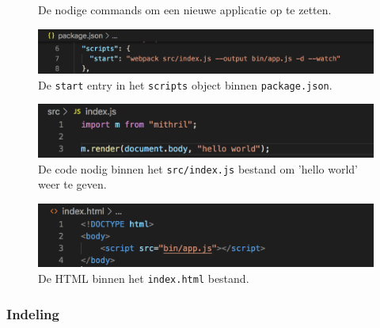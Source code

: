 \begin{figure}[!ht]
    \hfill
    \hfill
    \caption{De nodige commands om een nieuwe applicatie op te zetten.}
    \label{fig:setups}
\end{figure}

\begin{figure}
    \includegraphics[width=\textwidth]{./img/Mithril-package-json.png}
    \caption{De \texttt{start} entry in het \texttt{scripts} object binnen \texttt{package.json}.}
    \label{fig:mithril-package-json}
\end{figure}

\begin{figure}
    \includegraphics[width=\textwidth]{./img/Mithril-index-js.png}
    \caption{De code nodig binnen het \texttt{src/index.js} bestand om 'hello world' weer te geven.}
    \label{fig:mithril-index-js}
\end{figure}

\begin{figure}
    \includegraphics[width=\textwidth]{./img/Mithril-index-html.png}
    \caption{De HTML binnen het \texttt{index.html} bestand.}
    \label{fig:mithril-index-html}
\end{figure}

\subsubsection{Indeling}

